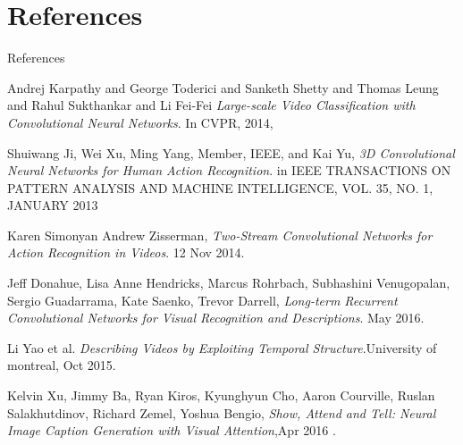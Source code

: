 \documentclass[pdf]{beamer}
\begin{document}
    \section{References}
    \begin{frame}[allowframebreaks]{References}
        \begin{thebibliography}{5}
        Andrej Karpathy and George Toderici and Sanketh Shetty and Thomas Leung and Rahul Sukthankar and Li Fei-Fei
        \textit {Large-scale Video Classification with Convolutional Neural Networks}. 
        In CVPR, 2014,
        
        

        Shuiwang Ji, Wei Xu, Ming Yang, Member, IEEE, and Kai Yu,
        \textit {3D Convolutional Neural Networks
for Human Action Recognition}. 
        in IEEE TRANSACTIONS ON PATTERN ANALYSIS AND MACHINE INTELLIGENCE, VOL. 35, NO. 1, JANUARY 2013
        
        Karen Simonyan Andrew Zisserman,
        \textit {Two-Stream Convolutional Networks
for Action Recognition in Videos}. 
12 Nov 2014.


        Jeff Donahue, Lisa Anne Hendricks, Marcus Rohrbach, Subhashini Venugopalan, Sergio Guadarrama,
Kate Saenko, Trevor Darrell,
        \textit {Long-term Recurrent Convolutional Networks for
Visual Recognition and Descriptions}. May 2016.




        Li Yao et al.
        \textit {Describing Videos by Exploiting Temporal Structure}.University of montreal, Oct 2015.

Kelvin Xu, Jimmy Ba, Ryan Kiros, Kyunghyun Cho, Aaron Courville, Ruslan Salakhutdinov, Richard Zemel, Yoshua Bengio,
\textit{Show, Attend and Tell: Neural Image Caption Generation with Visual Attention},Apr 2016 .

        \end{thebibliography}
    \end{frame}
\end{document}
